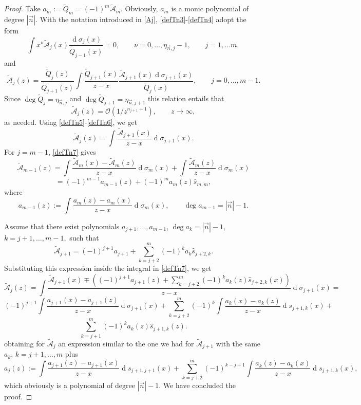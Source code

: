 \documentclass{amsart}
\numberwithin{equation}{section}
\theoremstyle{definition}
\DeclareMathOperator{\D}{d}        %
\newcommand{\n}{\vec{n}}          %
\begin{document}
\begin{proof}
    Take $a_{m} := \tilde{Q}_m = (-1)^{m}\tilde{\mathcal{A}}_{m}$. Obviously, $a_m$ is a monic  polynomial of degree $|\n|$. With the notation introduced in \eqref{Aj}, \eqref{defTn3}-\eqref{defTn4} adopt the form
    \begin{equation}
        \label{defTn5}
        \int x^\nu \tilde{\mathcal{A}}_{j}(x) \frac{  \D \sigma_{j}(x)}{ \tilde{Q}_{j-1}(x) } =0,\qquad \nu=0,\ldots,\eta_{\n,j} -1, \qquad j=1,\ldots m,
    \end{equation}
    and
    \begin{equation}
        \label{defTn6}
        \tilde{\mathcal{A}}_{j}(z)  = \frac{\tilde{Q}_{j}(z)}{\tilde{Q}_{j+1}(z)}\int \frac{\tilde{Q}_{j+1}(x)}{z-x}\frac{\tilde{\mathcal{A}}_{j+1}(x)\D\sigma_{j+1}(x)}{ \tilde{Q}_{j}(x) }, \qquad j=0,\ldots,m-1.
    \end{equation}
    Since $\deg \tilde{Q}_{j} = \eta_{\n,j}$ and $\deg \tilde{Q}_{j+1} =\eta_{\n,j+1}$ this relation entails that
    \[ \tilde{\mathcal{A}}_{j}(z) = \mathcal{O}(1/z^{n_{j+1} +1}), \qquad z \to \infty,
    \]
    as needed. Using \eqref{defTn5}-\eqref{defTn6}, we get
    \begin{equation}
        \label{defTn7}
        \tilde{\mathcal{A}}_{j}(z) = \int \frac{\tilde{\mathcal{A}}_{j+1}(x) }{z-x} \D\sigma_{j+1}(x).
    \end{equation}
    For $j= m-1$, \eqref{defTn7} gives
    \[
        \tilde{\mathcal{A}}_{m-1}(z) =   \int \frac{ \tilde{\mathcal{A}}_{m}(x)-  \tilde{\mathcal{A}}_{m}(z)}{z-x} \D\sigma_{m}(x) + \int \frac{  \tilde{\mathcal{A}}_{m}(z)}{z-x} \D\sigma_{m}(x)
    \]
    \[ = (-1)^{m-1}a_{m-1}(z)  + (-1)^m a_m(z) \widehat{s}_{m,m},
    \]
    where
    \[
      a_{m-1}(z):= \int \frac{{a}_{m}(z)-{a}_{m}(x)}{z-x}\D\sigma_{m}(x), \qquad \deg a_{m-1} = |\n| -1.
    \]

    Assume that there exist polynomials $a_{j+1},\ldots,a_{m-1}$, $\deg a_k = |\n| -1$, $k= j+1,\ldots,m-1,$ such that
    \[ \tilde{\mathcal{A}}_{j+1} = (-1)^{j+1} a_{j+1} + \sum_{k=j+2}^m (-1)^k a_{k}\widehat{s}_{j+2,k}.
    \]
    Substituting this expression inside the integral in \eqref{defTn7}, we get
    \[
      \tilde{\mathcal{A}}_{j}(z) = \int \frac{\tilde{\mathcal{A}}_{j+1}(x) \mp\left((-1)^{j+1} a_{j+1}(z) + \sum_{k=j+2}^m (-1)^k a_{k}(z)\widehat{s}_{j+2,k}(x)\right)}{z-x} \D\sigma_{j+1}(x) =
    \]
    \[
      (-1)^{j+1}\int \frac{a_{j+1}(x) -a_{j+1}(z)}{z-x} \D\sigma_{j+1}(x) + \sum_{k= j+2}^m (-1)^k \int \frac{a_{k}(x) -a_{k}(z)}{z-x} \D s_{j+1,k}(x) +
    \]
    \[  \sum_{k=j+1}^m (-1)^{k}a_{k}(z)\widehat{s} _{j+1,k}(z).
    \]
    obtaining  for $ \tilde{\mathcal{A}}_{j}$ an expression similar to the one we had for $ \tilde{\mathcal{A}}_{j+1}$ with the same $a_k$, $k=j+1,\ldots,m$  plus
    \[
      a_j(z) :=  \int \frac{a_{j+1}(z) -a_{j+1}(x)}{z-x} \D {s}_{j+1,j+1}(x) + \sum_{k= j+2}^m (-1)^{k-j+1} \int \frac{a_{k}(z) -a_{k}(x)}{z-x} \D s_{j+1,k}(x),
    \]
    which obviously is a polynomial of degree $|\n|-1$. We have concluded the proof.
    \end{proof}
\end{document}
